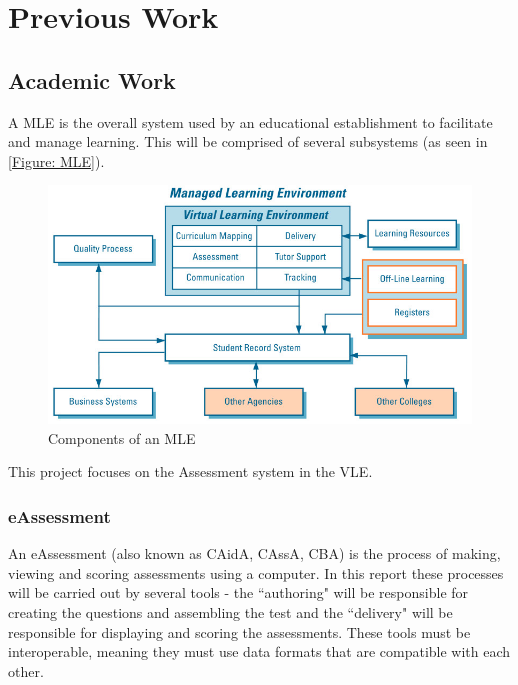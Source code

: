 \chapter{Previous Work} 
\label{Chapter:Previous Work}
\section{Academic Work} 
\label{Section:Academic Work}
A \gls{MLE} is the overall system used by an educational establishment to facilitate and manage learning. This will be comprised of several subsystems (as seen in \autoref{Figure: MLE}).

\begin{figure}[h]
	\centering 
		\includegraphics[scale=0.4]{../figures/MLE.png} 		
	\caption{\label{Figure: MLE} Components of an \gls{MLE} \citep{mle}} 	
\end{figure}

This project focuses on the Assessment system in the \gls{VLE}.

\subsection{eAssessment}
An \gls{eAssessment} (also known as \gls{CAidA}, \gls{CAssA}, \gls{CBA}) is the process of making, viewing and scoring assessments using a computer. In this report these processes will be carried out by several tools - the ``\gls{authoring}" will be responsible for creating the questions and assembling the test and the ``\gls{delivery}" will be responsible for displaying and scoring the assessments. These tools must be interoperable, meaning they must use data formats that are compatible with each other.

